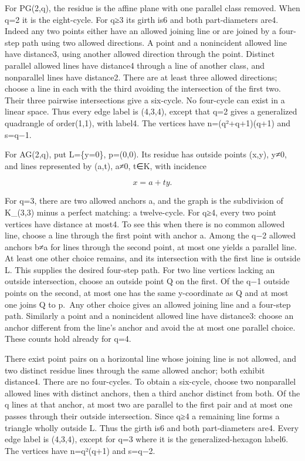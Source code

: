 \documentclass[
  11pt,
  a4paper,
]{article}
\begin{document}
For PG(2,q), the residue is the affine plane with one parallel class
removed. When q=2 it is the eight-cycle. For q≥3 its girth is6 and both
part-diameters are4. Indeed any two points either have an allowed
joining line or are joined by a four-step path using two allowed
directions. A point and a nonincident allowed line have distance3, using
another allowed direction through the point. Distinct parallel allowed
lines have distance4 through a line of another class, and nonparallel
lines have distance2. There are at least three allowed directions;
choose a line in each with the third avoiding the intersection of the
first two. Their three pairwise intersections give a six-cycle. No
four-cycle can exist in a linear space. Thus every edge label is
(4,3,4), except that q=2 gives a generalized quadrangle of order(1,1),
with label4. The vertices have n=(q²+q+1)(q+1) and s=q−1.

For AG(2,q), put L=\{y=0\}, p=(0,0). Its residue has outside points
(x,y), y≠0, and lines represented by (a,t), a≠0, t∈K, with incidence

\[
 x=a+ty.
\tag{11}
\]

For q=3, there are two allowed anchors a, and the graph is the
subdivision of K\_(3,3) minus a perfect matching: a twelve-cycle. For
q≥4, every two point vertices have distance at most4. To see this when
there is no common allowed line, choose a line through the first point
with anchor a. Among the q−2 allowed anchors b≠a for lines through the
second point, at most one yields a parallel line. At least one other
choice remains, and its intersection with the first line is outside L.
This supplies the desired four-step path. For two line vertices lacking
an outside intersection, choose an outside point Q on the first. Of the
q−1 outside points on the second, at most one has the same y-coordinate
as Q and at most one joins Q to p.~Any other choice gives an allowed
joining line and a four-step path. Similarly a point and a nonincident
allowed line have distance3: choose an anchor different from the line's
anchor and avoid the at most one parallel choice. These counts hold
already for q=4.

There exist point pairs on a horizontal line whose joining line is not
allowed, and two distinct residue lines through the same allowed anchor;
both exhibit distance4. There are no four-cycles. To obtain a six-cycle,
choose two nonparallel allowed lines with distinct anchors, then a third
anchor distinct from both. Of the q lines at that anchor, at most two
are parallel to the first pair and at most one passes through their
outside intersection. Since q≥4 a remaining line forms a triangle wholly
outside L. Thus the girth is6 and both part-diameters are4. Every edge
label is (4,3,4), except for q=3 where it is the generalized-hexagon
label6. The vertices have n=q²(q+1) and s=q−2.
\end{document}
